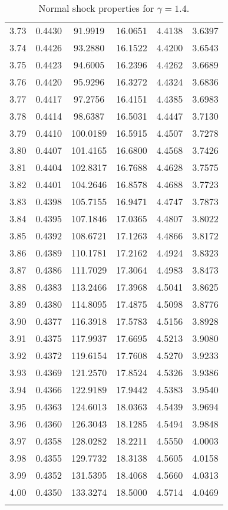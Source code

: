 \documentclass{article}
\begin{document}
\begin{longtable}{cccccc}
3.73 & 0.4430 & 91.9919 & 16.0651 & 4.4138 & 3.6397 \\
3.74 & 0.4426 & 93.2880 & 16.1522 & 4.4200 & 3.6543 \\
3.75 & 0.4423 & 94.6005 & 16.2396 & 4.4262 & 3.6689 \\
3.76 & 0.4420 & 95.9296 & 16.3272 & 4.4324 & 3.6836 \\
3.77 & 0.4417 & 97.2756 & 16.4151 & 4.4385 & 3.6983 \\
3.78 & 0.4414 & 98.6387 & 16.5031 & 4.4447 & 3.7130 \\
3.79 & 0.4410 & 100.0189 & 16.5915 & 4.4507 & 3.7278 \\
3.80 & 0.4407 & 101.4165 & 16.6800 & 4.4568 & 3.7426 \\
3.81 & 0.4404 & 102.8317 & 16.7688 & 4.4628 & 3.7575 \\
3.82 & 0.4401 & 104.2646 & 16.8578 & 4.4688 & 3.7723 \\
3.83 & 0.4398 & 105.7155 & 16.9471 & 4.4747 & 3.7873 \\
3.84 & 0.4395 & 107.1846 & 17.0365 & 4.4807 & 3.8022 \\
3.85 & 0.4392 & 108.6721 & 17.1263 & 4.4866 & 3.8172 \\
3.86 & 0.4389 & 110.1781 & 17.2162 & 4.4924 & 3.8323 \\
3.87 & 0.4386 & 111.7029 & 17.3064 & 4.4983 & 3.8473 \\
3.88 & 0.4383 & 113.2466 & 17.3968 & 4.5041 & 3.8625 \\
3.89 & 0.4380 & 114.8095 & 17.4875 & 4.5098 & 3.8776 \\
3.90 & 0.4377 & 116.3918 & 17.5783 & 4.5156 & 3.8928 \\
3.91 & 0.4375 & 117.9937 & 17.6695 & 4.5213 & 3.9080 \\
3.92 & 0.4372 & 119.6154 & 17.7608 & 4.5270 & 3.9233 \\
3.93 & 0.4369 & 121.2570 & 17.8524 & 4.5326 & 3.9386 \\
3.94 & 0.4366 & 122.9189 & 17.9442 & 4.5383 & 3.9540 \\
3.95 & 0.4363 & 124.6013 & 18.0363 & 4.5439 & 3.9694 \\
3.96 & 0.4360 & 126.3043 & 18.1285 & 4.5494 & 3.9848 \\
3.97 & 0.4358 & 128.0282 & 18.2211 & 4.5550 & 4.0003 \\
3.98 & 0.4355 & 129.7732 & 18.3138 & 4.5605 & 4.0158 \\
3.99 & 0.4352 & 131.5395 & 18.4068 & 4.5660 & 4.0313 \\
4.00 & 0.4350 & 133.3274 & 18.5000 & 4.5714 & 4.0469 \\
\bottomrule
\caption{Normal shock properties for $\gamma = 1.4$.}
\end{longtable}
\end{document}
